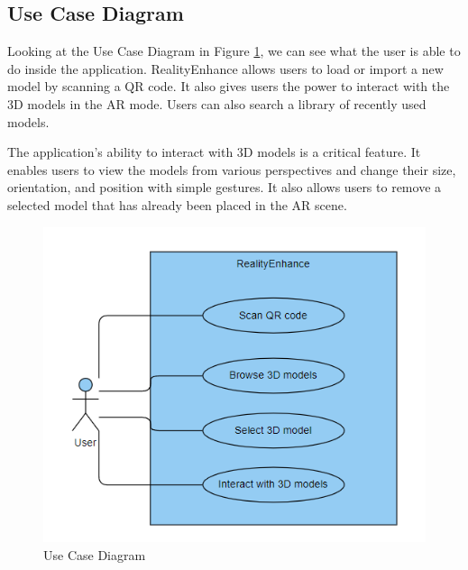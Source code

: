 \subsection*{Use Case Diagram}
Looking at the Use Case Diagram in Figure \ref{fig:UseCaseDiagram}, we can see what the user is able to do inside the application. RealityEnhance allows users to load or import a new model by scanning a \ac{QR} code. It also gives users the power to interact with the \ac{3D} models in the \ac{AR} mode.  Users can also search a library of recently used models.
\par
The application's ability to interact with \ac{3D} models is a critical feature. It enables users to view the models from various perspectives and change their size, orientation, and position with simple gestures. It also allows users to remove a selected model that has already been placed in the AR scene.
\begin{figure}[ht]
    \centering
    \includegraphics{img/UseCaseDiagram.png}
    \caption{Use Case Diagram}
    \label{fig:UseCaseDiagram}
\end{figure}

\clearpage


